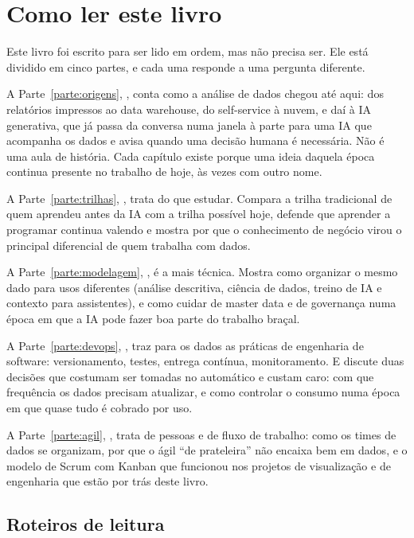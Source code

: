 \chapter{Como ler este livro}
\label{cap:como-ler}

Este livro foi escrito para ser lido em ordem, mas não precisa ser. Ele está dividido em
cinco partes, e cada uma responde a uma pergunta diferente.

A Parte~\ref{parte:origens}, \emph{}, conta como a análise de
dados chegou até aqui: dos relatórios impressos ao data warehouse, do self-service à
nuvem, e daí à IA generativa, que já passa da conversa numa janela à parte para uma IA que
acompanha os dados e avisa quando uma decisão humana é necessária. Não é uma aula de história. Cada capítulo existe porque
uma ideia daquela época continua presente no trabalho de hoje, às vezes com outro nome.

A Parte~\ref{parte:trilhas}, \emph{}, trata do que estudar. Compara
a trilha tradicional de quem aprendeu antes da IA com a trilha possível hoje, defende que
aprender a programar continua valendo e mostra por que o conhecimento de negócio virou o
principal diferencial de quem trabalha com dados.

A Parte~\ref{parte:modelagem}, \emph{}, é a mais técnica. Mostra
como organizar o mesmo dado para usos diferentes (análise descritiva, ciência de dados,
treino de IA e contexto para assistentes), e como cuidar de master data e de governança
numa época em que a IA pode fazer boa parte do trabalho braçal.

A Parte~\ref{parte:devops}, \emph{}, traz para os dados as práticas
de engenharia de software: versionamento, testes, entrega contínua, monitoramento. E
discute duas decisões que costumam ser tomadas no automático e custam caro: com que
frequência os dados precisam atualizar, e como controlar o consumo numa época em que quase
tudo é cobrado por uso.

A Parte~\ref{parte:agil}, \emph{}, trata de pessoas e de fluxo de
trabalho: como os times de dados se organizam, por que o ágil \enquote{de prateleira} não
encaixa bem em dados, e o modelo de Scrum com Kanban que funcionou nos projetos de
visualização e de engenharia que estão por trás deste livro.

\section*{Roteiros de leitura}

